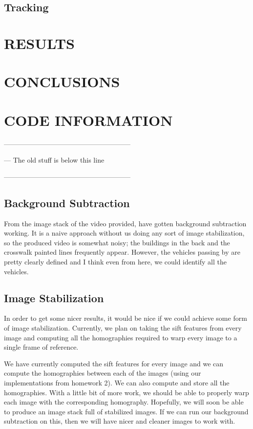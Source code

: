 \documentclass[a4paper, 10pt, conference]{ieeeconf}      %
\begin{document}
\subsection{Tracking}

\section{RESULTS}


\section{CONCLUSIONS}


\section{CODE INFORMATION}



--------------------------------------------------------

--- The old stuff is below this line

--------------------------------------------------------



\subsection{Background Subtraction}
From the image stack of the video provided, have gotten background subtraction working. It is a naive approach without us doing any sort of image stabilization, so the produced video is somewhat noisy; the buildings in the back and the crosswalk painted lines frequently appear. However, the vehicles passing by are pretty clearly defined and I think even from here, we could identify all the vehicles.

\subsection{Image Stabilization}
In order to get some nicer results, it would be nice if we could achieve some form of image stabilization. Currently, we plan on taking the sift features from every image and computing all the homographies required to warp every image to a single frame of reference. \newline

We have currently computed the sift features for every image and we can compute the homographies between each of the images (using our implementations from homework 2). We can also compute and store all the homographies. With a little bit of more work, we should be able to properly warp each image with the corresponding homography. Hopefully, we will soon be able to produce an image stack full of stabilized images. If we can run our background subtraction on this, then we will have nicer and cleaner images to work with. \newline
\end{document}
